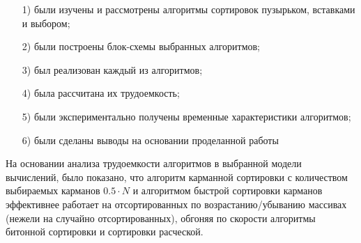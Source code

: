 \documentclass[12pt]{report}
\begin{document}
	\begin{enumerate}
		\item[1)] были изучены и рассмотрены алгоритмы сортировок пузырьком, вставками и выбором;
		\item[2)] были построены блок-схемы выбранных алгоритмов;
		\item[3)] был реализован каждый из алгоритмов;
		\item[4)] была рассчитана их трудоемкость;
		\item[5)] были экспериментально получены временные характеристики алгоритмов;
		\item[6)] были сделаны выводы на основании проделанной работы
	\end{enumerate}
	
	На основании анализа трудоемкости алгоритмов в выбранной модели вычислений, было показано, что алгоритм карманной сортировки с количеством выбираемых карманов $0.5 \cdot N$ и алгоритмом быстрой сортировки карманов эффективнее работает на отсортированных по возрастанию/убыванию массивах (нежели на случайно отсортированных), обгоняя по скорости алгоритмы битонной сортировки и сортировки расческой.
	

\nocite{*} 

\renewcommand\bibname{Список использованных источников} %
	
\end{document}
